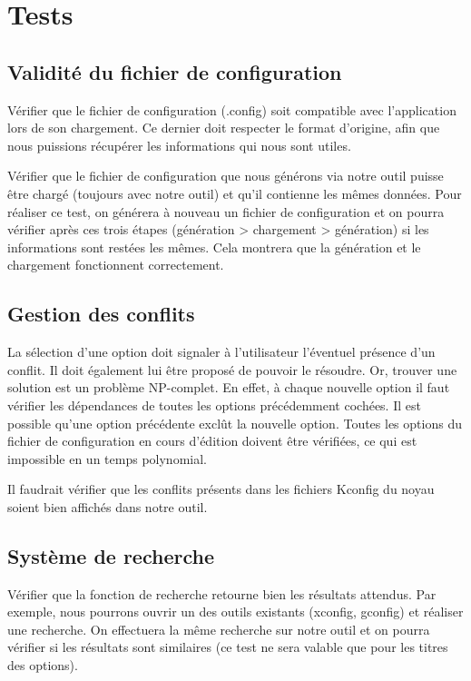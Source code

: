 \documentclass[16pts]{report}
\begin{document}
\chapter{Tests}
\label{cha:Tests}

\section{Validité du fichier de configuration}
\label{sec:Validité du fichier de configuration}

Vérifier que le fichier de configuration (.config) soit compatible avec
l'application lors de son chargement. Ce dernier doit respecter le format
d'origine, afin que nous puissions récupérer les informations qui nous sont
utiles.

Vérifier que le fichier de configuration que nous générons via notre outil
puisse être chargé (toujours avec notre outil) et qu'il contienne les mêmes
données. Pour réaliser ce test, on générera à nouveau un fichier de
configuration et on pourra vérifier après ces trois étapes (génération >
chargement > génération) si les informations sont restées les mêmes. Cela
montrera que la génération et le chargement fonctionnent correctement.


\section{Gestion des conflits}
\label{sec:Gestion des conflits}

La sélection d'une option doit signaler à l'utilisateur l'éventuel présence
d'un conflit. Il doit également lui être proposé de pouvoir le résoudre. Or,
trouver une solution est un problème NP-complet. En effet, à chaque nouvelle
option il faut vérifier les dépendances de toutes les options précédemment
cochées. Il est possible qu'une option précédente exclût la nouvelle option.
Toutes les options du fichier de configuration en cours d'édition doivent être
vérifiées, ce qui est impossible en un temps polynomial.

Il faudrait vérifier que les conflits présents dans les fichiers Kconfig du
noyau soient bien affichés dans notre outil.


\section{Système de recherche}
\label{sec:Système de recherche}

Vérifier que la fonction de recherche retourne bien les résultats attendus.
Par exemple, nous pourrons ouvrir un des outils existants (xconfig, gconfig) et
réaliser une recherche. On effectuera la même recherche sur notre outil et on
pourra vérifier si les résultats sont similaires (ce test ne sera valable que
pour les titres des options).
\end{document}
